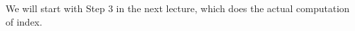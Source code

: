		We will start with Step 3 in the next lecture, which does the actual computation of index.
		
		
		
		
		
	
		
		




% 

	
		
% 	